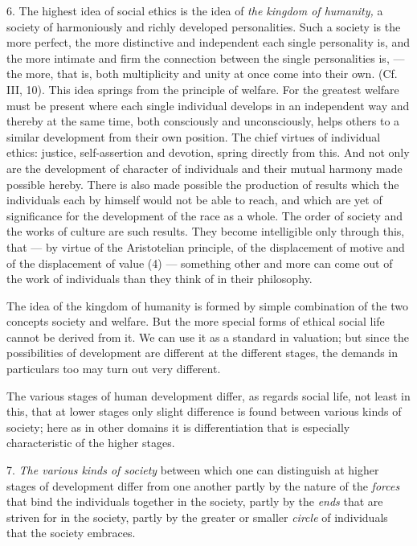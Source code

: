 \documentclass[12pt,a4paper,openany]{book}
\newcommand{\opage}[1]{\marginnote{\footnotesize\textit{[#1]}}}
\begin{document}
6. The highest idea of social ethics is the idea of \textit{the kingdom of humanity,} a society of harmoniously and
richly developed personalities. Such a society is the more perfect, the more distinctive and independent each single
personality is, and the more intimate and firm the connection between the single personalities is, --- the more, that
is, both multiplicity and unity at once come into their own. (Cf. III, 10). This idea springs from the principle of
welfare. For the greatest welfare must be present where each single individual develops in an independent way and
thereby at the same time, both consciously and unconsciously, helps others
\opage{274}to a similar development from their own position. The chief virtues of individual ethics: justice,
self-assertion and devotion, spring directly from this. And not only are the development of character of individuals
and their mutual harmony made possible hereby. There is also made possible the production of results which the
individuals each by himself would not be able to reach, and which are yet of significance for the development of the
race as a whole. The order of society and the works of culture are such results. They become intelligible only through
this, that --- by virtue of the Aristotelian principle, of the displacement of motive and of the displacement of value
(4) --- something other and more can come out of the work of individuals than they think of in their philosophy.

The idea of the kingdom of humanity is formed by simple combination of the two concepts society and welfare. But the
more special forms of ethical social life cannot be derived from it. We can use it as a standard in valuation; but since
the possibilities of development are different at the different stages, the demands in particulars too may turn out
very different.

The various stages of human development differ, as regards social life, not least in this, that at lower stages only
slight difference is found between various kinds of society; here as in other domains it is differentiation that is
especially characteristic of the higher stages.

7. \textit{The various kinds of society} between which one can distinguish at higher stages of development differ from
one another partly by the nature of the \textit{forces} that bind the individuals together in the society, partly by the
\textit{ends} that are striven for in the society, partly by the greater or smaller \textit{circle} of individuals that
the society embraces.
\end{document}
